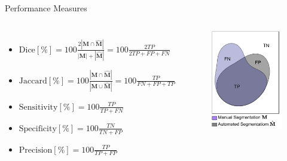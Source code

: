 \documentclass[aspectratio=169]{beamer}
\begin{document}
\begin{frame}{Performance Measures}

    
\begin{columns}



\begin{itemize}
    \setlength\itemsep{1em}
    \item $\text{Dice}[\%] = 100 \frac{2|\mathbf{M}  \cap \mathbf{\hat{M}} |}{|\mathbf{M} | + |\mathbf{\hat{M}} |} = 100\frac{2 TP}{2TP + FP + FN}$
    
    
    \item $\text{Jaccard}[\%] = 100\frac{|\mathbf{M}  \cap \mathbf{\hat{M}} |}{|\mathbf{M}  \cup \mathbf{\hat{M}} |} = 100\frac{TP}{FN + FP + TP} $\\
    
    \item $\text{Sensitivity}[\%] = 100\frac{TP}{TP + FN}$

    \item $\text{Specificity}[\%] = 100\frac{TN}{TN + FP}$

    \item $\text{Precision}[\%] = 100\frac{TP}{TP + FP} $

\end{itemize}
 \begin{figure}
     \centering \includegraphics[width=0.6\linewidth]{Figures/regions.pdf}
 \end{figure}
\end{columns}    

    
\end{frame}
\end{document}
